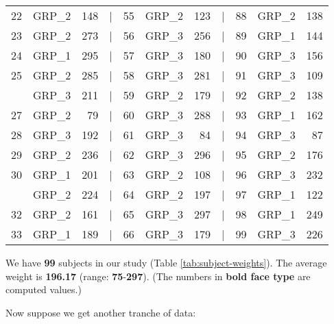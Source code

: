 \documentclass[smallextended]{svjour3}       %
\begin{document}
\begin{table}
\begin{tabular}[t]{rlrlrlrlrlr}
22 & GRP\_2 & 148 & | & 55 & GRP\_2 & 123 & | & 88 & GRP\_2 & 138\\
23 & GRP\_2 & 273 & | & 56 & GRP\_3 & 256 & | & 89 & GRP\_1 & 144\\
24 & GRP\_1 & 295 & | & 57 & GRP\_3 & 180 & | & 90 & GRP\_3 & 156\\
25 & GRP\_2 & 285 & | & 58 & GRP\_3 & 281 & | & 91 & GRP\_3 & 109\\
\addlinespace
26 & GRP\_3 & 211 & | & 59 & GRP\_2 & 179 & | & 92 & GRP\_2 & 138\\
27 & GRP\_2 & 79 & | & 60 & GRP\_3 & 288 & | & 93 & GRP\_1 & 162\\
28 & GRP\_3 & 192 & | & 61 & GRP\_3 & 84 & | & 94 & GRP\_3 & 87\\
29 & GRP\_2 & 236 & | & 62 & GRP\_3 & 296 & | & 95 & GRP\_2 & 176\\
30 & GRP\_1 & 201 & | & 63 & GRP\_2 & 108 & | & 96 & GRP\_3 & 232\\
\addlinespace
31 & GRP\_2 & 224 & | & 64 & GRP\_2 & 197 & | & 97 & GRP\_1 & 122\\
32 & GRP\_2 & 161 & | & 65 & GRP\_3 & 297 & | & 98 & GRP\_1 & 249\\
33 & GRP\_1 & 189 & | & 66 & GRP\_3 & 179 & | & 99 & GRP\_3 & 226\\
\bottomrule
\end{tabular}
\end{table}

We have \textbf{99} subjects in our study (Table \ref{tab:subject-weights}). The average weight is \textbf{196.17} (range: \textbf{75}-\textbf{297}). (The numbers in \textbf{bold face type} are computed values.)

Now suppose we get another tranche of data:
\end{document}
